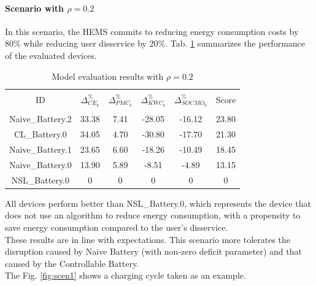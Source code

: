\paragraph{Scenario with $\rho = 0.2$}
In this scenario, the HEMS commits to reducing energy consumption costs by 80\% while reducing user disservice by 20\%. Tab. \ref{tab:scen1} summarizes the performance of the evaluated devices.
\begin{table}[H]
    \center
    \caption{Model evaluation results with $\rho = 0.2$}
    \label{tab:scen1}
    \begin{tabular}{c|c|c|c|c|c}
        \hline
        \hline
        & & & & & \\
        ID   & $\Delta^\%_{CE_b}$   &  $\Delta^\%_{PMC_b}$  & $\Delta^\%_{KWC_b}$   & $\Delta^\%_{SOCMO_b}$ & Score\\
        & & & & & \\
        \hline
        Naive\_Battery.2     & 33.38     & 7.41     & -28.05    & -16.12     &   23.80 \\
        \hline
        CL\_Battery.0       & 34.05      & 4.70     & -30.80    & -17.70      &   21.30    \\
        \hline
        Naive\_Battery.1     & 23.65     & 6.60     & -18.26    & -10.49    &   18.45  \\
        \hline
        Naive\_Battery.0     & 13.90     & 5.89     & -8.51     & -4.89     &   13.15   \\
        \hline
        NSL\_Battery.0      & 0         & 0         & 0         & 0         &   0  \\
        \hline
        \hline
    \end{tabular}
\end{table}
All devices perform better than NSL\_Battery.0, which represents the device that does not use an algorithm to reduce energy consumption, with a propensity to save energy consumption compared to the user's disservice.\\
These results are in line with expectations. This scenario more tolerates the disruption caused by Naive Battery (with non-zero deficit parameter) and that caused by the Controllable Battery. \\
The Fig. \ref{fig:scen1} shows a charging cycle taken as an example.

